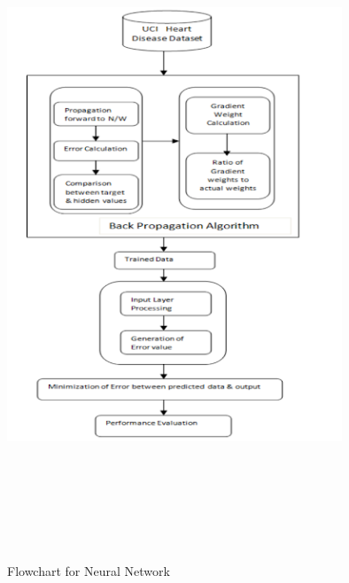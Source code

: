 \documentclass[oneside,12pt]{Classes/VTU}
\begin{document}
\begin{figure}[H]
	\begin{center}
		\includegraphics[width=10cm, height=20cm]{images/neural_network.png}
		\caption{Flowchart for Neural Network}	
	\end{center}
\end{figure}
\end{document}
